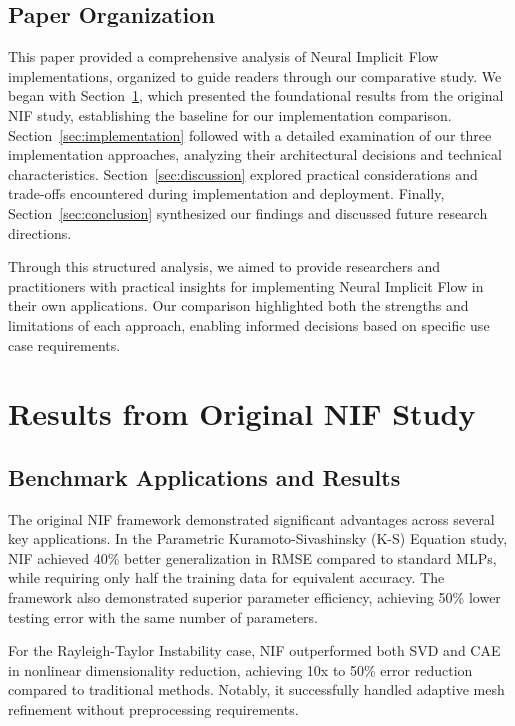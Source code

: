 \documentclass[10pt,journal,compsoc,onecolumn]{IEEEtran}
\begin{document}
\subsection{Paper Organization}
This paper provided a comprehensive analysis of Neural Implicit Flow implementations, organized to guide readers through our comparative study. We began with Section~\ref{sec:original_results}, which presented the foundational results from the original NIF study, establishing the baseline for our implementation comparison. Section~\ref{sec:implementation} followed with a detailed examination of our three implementation approaches, analyzing their architectural decisions and technical characteristics. Section~\ref{sec:discussion} explored practical considerations and trade-offs encountered during implementation and deployment. Finally, Section~\ref{sec:conclusion} synthesized our findings and discussed future research directions.

Through this structured analysis, we aimed to provide researchers and practitioners with practical insights for implementing Neural Implicit Flow in their own applications. Our comparison highlighted both the strengths and limitations of each approach, enabling informed decisions based on specific use case requirements.

\section{Results from Original NIF Study}\label{sec:original_results}
\subsection{Benchmark Applications and Results}
The original NIF framework demonstrated significant advantages across several key applications. In the Parametric Kuramoto-Sivashinsky (K-S) Equation study, NIF achieved 40\% better generalization in RMSE compared to standard MLPs, while requiring only half the training data for equivalent accuracy. The framework also demonstrated superior parameter efficiency, achieving 50\% lower testing error with the same number of parameters.~\cite{nif2023}

For the Rayleigh-Taylor Instability case, NIF outperformed both SVD and CAE in nonlinear dimensionality reduction, achieving 10x to 50\% error reduction compared to traditional methods. Notably, it successfully handled adaptive mesh refinement without preprocessing requirements.~\cite{nif2023}
\end{document}
